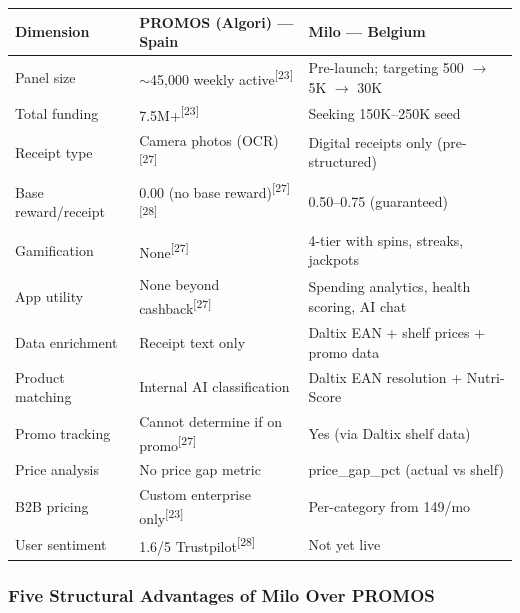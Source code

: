 \documentclass[11pt,a4paper]{article}
\begin{document}
\begin{center}
\renewcommand{\arraystretch}{1.35}
\begin{tabularx}{\textwidth}{L{3.2cm} L{5.1cm} L{5.1cm}}
\toprule
{}
\textbf{\color{white}Dimension} & \textbf{\color{white}PROMOS (Algori) --- Spain} & \textbf{\color{white}Milo --- Belgium} \\
\midrule
Panel size & $\sim$45,000 weekly active\textsuperscript{[23]} & Pre-launch; targeting 500 $\rightarrow$ 5K $\rightarrow$ 30K \\
Total funding & \texteuro{}7.5M+\textsuperscript{[23]} & Seeking \texteuro{}150K--250K seed \\
Receipt type & Camera photos (OCR)\textsuperscript{[27]} & Digital receipts only (pre-structured) \\
Base reward/receipt & \texteuro{}0.00 (no base reward)\textsuperscript{[27][28]} & \texteuro{}0.50--0.75 (guaranteed) \\
Gamification & None\textsuperscript{[27]} & 4-tier with spins, streaks, jackpots \\
App utility & None beyond cashback\textsuperscript{[27]} & Spending analytics, health scoring, AI chat \\
Data enrichment & Receipt text only & Daltix EAN + shelf prices + promo data \\
Product matching & Internal AI classification & Daltix EAN resolution + Nutri-Score \\
Promo tracking & Cannot determine if on promo\textsuperscript{[27]} & Yes (via Daltix shelf data) \\
Price analysis & No price gap metric & price\_gap\_pct (actual vs shelf) \\
B2B pricing & Custom enterprise only\textsuperscript{[23]} & Per-category from \texteuro{}149/mo \\
User sentiment & 1.6/5 Trustpilot\textsuperscript{[28]} & Not yet live \\
\bottomrule
\end{tabularx}
\end{center}

\vspace{0.5em}

\subsubsection{Five Structural Advantages of Milo Over PROMOS}
\end{document}
